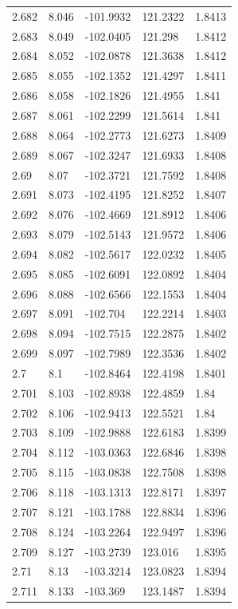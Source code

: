 \begin{tabular}{lllll}
2.682 & 8.046 & -101.9932 & 121.2322 & 1.8413 \\
2.683 & 8.049 & -102.0405 & 121.298 & 1.8412 \\
2.684 & 8.052 & -102.0878 & 121.3638 & 1.8412 \\
2.685 & 8.055 & -102.1352 & 121.4297 & 1.8411 \\
2.686 & 8.058 & -102.1826 & 121.4955 & 1.841 \\
2.687 & 8.061 & -102.2299 & 121.5614 & 1.841 \\
2.688 & 8.064 & -102.2773 & 121.6273 & 1.8409 \\
2.689 & 8.067 & -102.3247 & 121.6933 & 1.8408 \\
2.69 & 8.07 & -102.3721 & 121.7592 & 1.8408 \\
2.691 & 8.073 & -102.4195 & 121.8252 & 1.8407 \\
2.692 & 8.076 & -102.4669 & 121.8912 & 1.8406 \\
2.693 & 8.079 & -102.5143 & 121.9572 & 1.8406 \\
2.694 & 8.082 & -102.5617 & 122.0232 & 1.8405 \\
2.695 & 8.085 & -102.6091 & 122.0892 & 1.8404 \\
2.696 & 8.088 & -102.6566 & 122.1553 & 1.8404 \\
2.697 & 8.091 & -102.704 & 122.2214 & 1.8403 \\
2.698 & 8.094 & -102.7515 & 122.2875 & 1.8402 \\
2.699 & 8.097 & -102.7989 & 122.3536 & 1.8402 \\
2.7 & 8.1 & -102.8464 & 122.4198 & 1.8401 \\
2.701 & 8.103 & -102.8938 & 122.4859 & 1.84 \\
2.702 & 8.106 & -102.9413 & 122.5521 & 1.84 \\
2.703 & 8.109 & -102.9888 & 122.6183 & 1.8399 \\
2.704 & 8.112 & -103.0363 & 122.6846 & 1.8398 \\
2.705 & 8.115 & -103.0838 & 122.7508 & 1.8398 \\
2.706 & 8.118 & -103.1313 & 122.8171 & 1.8397 \\
2.707 & 8.121 & -103.1788 & 122.8834 & 1.8396 \\
2.708 & 8.124 & -103.2264 & 122.9497 & 1.8396 \\
2.709 & 8.127 & -103.2739 & 123.016 & 1.8395 \\
2.71 & 8.13 & -103.3214 & 123.0823 & 1.8394 \\
2.711 & 8.133 & -103.369 & 123.1487 & 1.8394 \\

\end{tabular}
